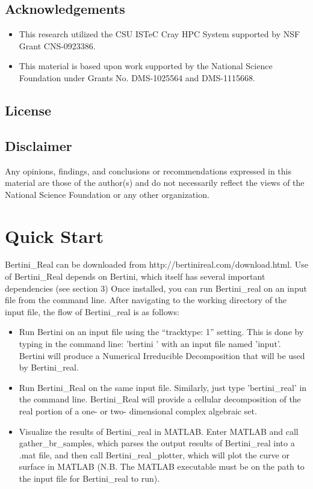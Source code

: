 \documentclass[10pt]{article}
\begin{document}
\subsection*{Acknowledgements}
\begin{itemize}
\item  This research utilized the CSU ISTeC Cray HPC System supported by NSF Grant CNS-0923386.
\item  This material is based upon work supported by the National Science Foundation under Grants No. DMS-1025564 and DMS-1115668.
\end{itemize}

\subsection{License}
\label{sec:license}

\subsection*{Disclaimer}

Any opinions, findings, and conclusions or recommendations expressed in this material are those of the author(s) and do not necessarily reflect the views of the National Science Foundation or any other organization.




\clearpage
\section{Quick Start}

Bertini\_Real can be downloaded from http://bertinireal.com/download.html. Use of Bertini\_Real depends on Bertini, which itself has several important dependencies (see section 3)
Once installed, you can run Bertini\_real on an input file from the command line. After navigating to the working directory of the input file, the flow of Bertini\_real is as follows:
\begin{itemize}
\item Run Bertini on an input file using the ``tracktype: 1'' setting. This is done by typing in the command line: 'bertini ' with an input file named 'input'. Bertini will produce a Numerical Irreducible Decomposition that will be used by Bertini\_real.
\item Run Bertini\_Real on the same input file. Similarly, just type 'bertini\_real' in the command line. Bertini\_Real will provide a cellular decomposition of the real portion of a one- or two- dimensional complex algebraic set.
\item Visualize the results of Bertini\_real in MATLAB. Enter MATLAB and call gather\_br\_samples, which parses the output results of Bertini\_real into a .mat file, and then call Bertini\_real\_plotter, which will plot the curve or surface in MATLAB (N.B. The MATLAB executable must be on the path to the input file for Bertini\_real to run).
\end{itemize}
\label{sec:started}
\end{document}
